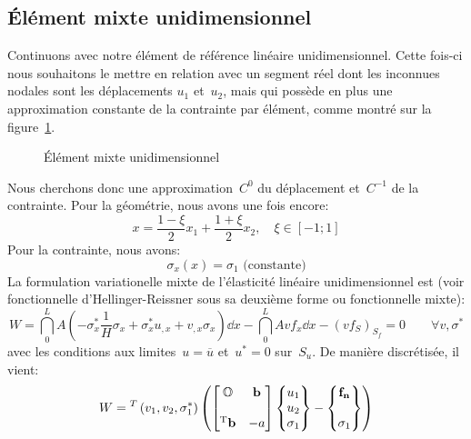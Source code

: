   \subsection{Élément mixte unidimensionnel}
\fi
Continuons avec notre élément de référence linéaire unidimensionnel. Cette fois-ci nous souhaitons
le mettre en relation avec un segment réel dont les inconnues nodales sont les déplacements
$u_1$ et~$u_2$, mais qui possède en plus une approximation constante de la contrainte
par élément, comme montré sur la figure~\ref{fig-ex2mixte}.
\begin{figure}[ht]\centering
{} \hspace{5 em}
\caption{Élément mixte unidimensionnel}\label{fig-ex2mixte}
\end{figure}
\medskipvm
Nous cherchons donc une approximation~$C^0$ du déplacement et~$C^{-1}$ de la
contrainte.
\medskipvm
Pour la géométrie, nous avons une fois encore:
\begin{equation} x=\frac{1-\xi}2 x_1 + \frac{1+\xi}2 x_2, \quad \xi\in[-1;1] \end{equation}
\medskipvm
Pour la contrainte, nous avons:
\begin{equation} \sigma_x(x)=\sigma_1 \text{ (constante)} \end{equation}
\medskipvm
La formulation variationelle mixte de l'élasticité linéaire unidimensionnel est (voir fonctionnelle
d'Hellinger-Reissner sous sa deuxième forme ou fonctionnelle mixte):
\begin{equation}
W=\dint_0^L A\left(-\sigma_x^*\frac1H\sigma_x+\sigma_x^*u_{,x}+v_{,x}\sigma_x\right) \dd x
-\dint_0^L Avf_x \dd x - (v f_S)_{S_f} = 0\qquad \forall v,\sigma^*
\end{equation}
avec les conditions aux limites~$u=\overline{u}$ et~$u^*=0$ sur~$S_u$.
\medskipvm
De manière discrétisée, il vient:
\begin{equation}
W = \LLL{v_1, v_2, \sigma_1^*}\left(
\MM*{\mO & \VV{b}\\ ~\\ \LL{b} & -a}
\VV*{u_1\\u_2\\ \sigma_1}
- \VV*{\VV{f_n}\\~\\ \sigma_1}
\right)\end{equation}
